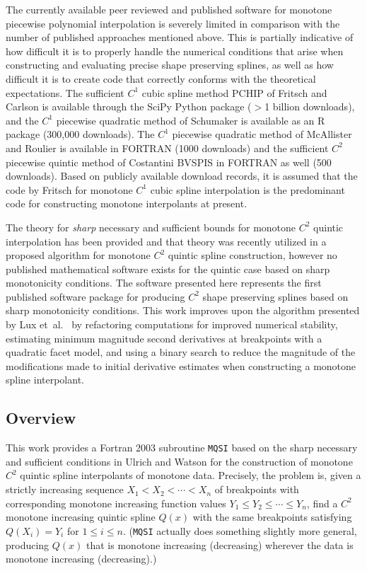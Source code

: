 The currently available peer reviewed and published software for
monotone piecewise polynomial interpolation is severely limited in
comparison with the number of published approaches mentioned
above. This is partially indicative of how difficult it is to properly
handle the numerical conditions that arise when constructing and
evaluating precise shape preserving splines, as well as how difficult
it is to create code that correctly conforms with the theoretical
expectations. The sufficient $C^1$ cubic spline method PCHIP of
Fritsch and Carlson \cite{fritsch1980monotone} is available through
the SciPy Python package ($>$1 billion downloads), and the $C^1$
piecewise quadratic method of Schumaker \cite{schumaker1983shape} is
available as an R package (300,000 downloads). The $C^1$ piecewise
quadratic method of McAllister and Roulier
\cite{mcallister1981algorithm,mcallister1981shape} is available in
FORTRAN (1000 downloads) and the sufficient $C^2$ piecewise quintic
method of Costantini
\cite{constantini1997boundary,constantini1997bvspis} BVSPIS in FORTRAN
as well (500 downloads). Based on publicly available download records,
it is assumed that the code by Fritsch \cite{fritsch1980monotone} for
monotone $C^1$ cubic spline interpolation is the predominant code for
constructing monotone interpolants at present.

The theory for {\it sharp} necessary and sufficient bounds for
monotone $C^2$ quintic interpolation has been provided
\cite{ulrich1990positivity,ulrich1994positivity} and that theory was
recently utilized in a proposed algorithm
\cite{lux2020algorithm,lux2020thesis} for monotone $C^2$ quintic
spline construction, however no published mathematical software exists
for the quintic case based on sharp monotonicity conditions. The
software presented here represents the first published software
package for producing $C^2$ shape preserving splines based on sharp
monotonicity conditions. This work improves upon the algorithm
presented by Lux et\ al.\ \cite{lux2020algorithm} by refactoring
computations for improved numerical stability, estimating minimum
magnitude second derivatives at breakpoints with a quadratic facet
model, and using a binary search to reduce the magnitude of the
modifications made to initial derivative estimates when constructing a
monotone spline interpolant.

\subsection*{Overview}
This work provides a Fortran 2003 subroutine {\tt MQSI} based on the
sharp necessary and sufficient conditions in Ulrich and Watson
\cite{ulrich1994positivity} for the construction of monotone $C^2$
quintic spline interpolants of monotone data. Precisely, the problem
is, given a strictly increasing sequence $X_1<X_2< \cdots <X_n$ of
breakpoints with corresponding monotone increasing function values
$Y_1\le Y_2\le \cdots \le Y_n$, find a $C^2$ monotone increasing
quintic spline $Q(x)$ with the same breakpoints satisfying
$Q(X_i)=Y_i$ for $1\le i\le n$. ({\tt MQSI} actually does something
slightly more general, producing $Q(x)$ that is monotone increasing
(decreasing) wherever the data is monotone increasing (decreasing).)

